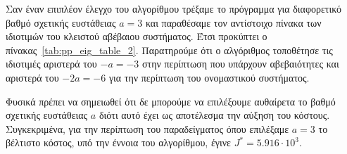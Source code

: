 Σαν έναν επιπλέον έλεγχο του αλγορίθμου τρέξαμε το πρόγραμμα για διαφορετικό
βαθμό σχετικής ευστάθειας \( a = 3 \) και παραθέσαμε τον αντίστοιχο πίνακα των
ιδιοτιμών του κλειστού αβέβαιου συστήματος. Έτσι προκύπτει ο
πίνακας~\ref{tab:pp_eig_table_2}. Παρατηρούμε ότι ο αλγόριθμος τοποθέτησε τις
ιδιοτιμές αριστερά του \( -a = -3 \) στην περίπτωση που υπάρχουν αβεβαιότητες
και αριστερά του \( -2a = -6 \) για την περίπτωση του ονομαστικού συστήματος.
\begin{table}[h]
    \centering
    \eng{\[
            \begin{tabu}{ c | c | c | c | c | c | c}
                {} & r_1 = r_2 = 0 & r_1 = r_2 = -1 & r_1 = r_2 = 1
                & r_1 = 1, r_2 = -1 & r_1 = 0, r_2 = -1 & r_1 = 1, r_2 = 0 \\
                \hline
                \lambda_1 & -6.6622 & -3.6898 & -3.3941 & -3.5145 & -3.5998 &
                -4.1965 \\
                \lambda_2 & -7 & -3.6898 & -6.6996 & -3.5145 & -3.5998 &
                -4.1965 \\
                \lambda_3 & -8.1358 & -11.4138 & -6.6996 & -11.7642 & -11.5938
                & -9.4002 \\
            \end{tabu}
    \]}
    \label{tab:pp_eig_table_2}
\end{table}
\begin{table}[h]
    \centering
    \eng{\[
            \begin{tabu}{ c | c | c | c | c | c | c}
                {} & r_1 = r_2 = 0 & r_1 = r_2 = -1 & r_1 = r_2 = 1
                & r_1 = 1, r_2 = -1 & r_1 = 0, r_2 = -1 & r_1 = 1, r_2 = 0 \\
                \hline
                \lambda_1 & -20.6622 & -14.497 & -15.7631 & -14.4131 & -14.4548
                & -15.5262 \\
                \lambda_2 & -21      & -14.497 & -20.2793 & -14.4131 & -14.4548
                & -15.5262 \\
                \lambda_3 & -22.1358 & -33.8695 & -24.821 & -34.0372 & -33.9538
                & -30.8111 \\
            \end{tabu}
    \]}
    \label{tab:pp_eig_table_3}
\end{table}
Φυσικά πρέπει να σημειωθεί ότι δε μπορούμε να επιλέξουμε αυθαίρετα το βαθμό
σχετικής ευστάθειας \( a \) διότι αυτό έχει ως αποτέλεσμα την αύξηση του
κόστους. Συγκεκριμένα, για την περίπτωση του παραδείγματος όπου επιλέξαμε \( a
= 3 \) το βέλτιστο κόστος, υπό την έννοια του αλγορίθμου, έγινε \( J^* = 5.916
\cdot 10^3 \).

